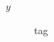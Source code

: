 \documentclass[11pt]{article}
\author{root}
\date{\today}
\title{}
\begin{document}
\tableofcontents

\begin{description}
\item[{\(y\)}] tag
\end{description}
\end{document}
